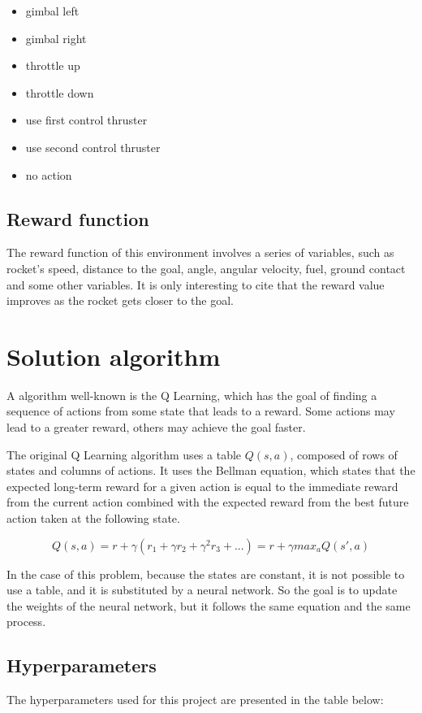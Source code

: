 \documentclass{article}
\begin{document}
\begin{itemize}
	\item gimbal left
    \item gimbal right
    \item throttle up
    \item throttle down
    \item use first control thruster
    \item use second control thruster
    \item no action
\end{itemize}

\subsection{Reward function}
The reward function of this environment involves a series of variables, such as rocket's speed, distance to the goal, angle, angular velocity, fuel, ground contact and some other variables. It is only interesting to cite that the reward value improves as the rocket gets closer to the goal.

\section{Solution algorithm}
A algorithm well-known is the Q Learning, which has the goal of finding a sequence of actions from some state that leads to a reward. Some actions may lead to a greater reward, others may achieve the goal faster.

The original Q Learning algorithm uses a table $Q(s,a)$, composed of rows of states and columns of actions. It uses the Bellman equation, which states that the expected long-term reward for a given action is equal to the immediate reward from the current action combined with the expected reward from the best future action taken at the following state.

\[Q(s,a)=r+\gamma(r_1+\gamma r_2+\gamma^2 r_3+...)=r+\gamma max_a Q(s',a)\]

In the case of this problem, because the states are constant, it is not possible to use a table, and it is substituted by a neural network. So the goal is to update the weights of the neural network, but it follows the same equation and the same process.

\subsection{Hyperparameters}
The hyperparameters used for this project are presented in the table below:
\end{document}
